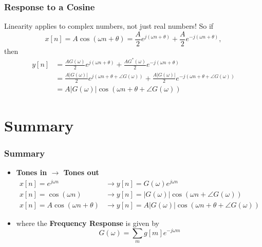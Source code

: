 \documentclass{beamer}
\begin{document}
\begin{frame}
  \frametitle{Response to a Cosine}
  Linearity applies to complex numbers, not just  real numbers!
  So if
  \[
  x[n] = A\cos(\omega n+\theta) = \frac{A}{2}e^{j(\omega n+\theta)}+\frac{A}{2}e^{-j(\omega n+\theta)},
  \]
  then
  \begin{align*}
    y[n] &= \frac{AG(\omega)}{2}e^{j(\omega n+\theta)}+\frac{AG^*(\omega)}{2}e^{-j(\omega n+\theta)}\\
    &= \frac{A|G(\omega)|}{2}e^{j(\omega n+\theta+\angle G(\omega))}+\frac{A|G(\omega)|}{2}e^{-j(\omega n+\theta+\angle G(\omega))}\\
    &= A|G(\omega)|\cos\left(\omega n+\theta+\angle G(\omega)\right)
  \end{align*}
\end{frame}

\section[Summary]{Summary}
\setcounter{subsection}{1}

\begin{frame}
  \frametitle{Summary}
  \begin{itemize}
  \item {\bf Tones in $\rightarrow$ Tones out}
    \begin{align*}
      x[n]=e^{j\omega n} &\rightarrow y[n]=G(\omega)e^{j\omega n}\\
      x[n]=\cos\left(\omega n\right)
      &\rightarrow y[n]=|G(\omega)|\cos\left(\omega n+\angle G(\omega)\right)\\
      x[n]=A\cos\left(\omega n+\theta\right)
      &\rightarrow y[n]=A|G(\omega)|\cos\left(\omega n+\theta+\angle G(\omega)\right)
    \end{align*}
  \item where the {\bf Frequency Response} is given by
    \[
    G(\omega) = \sum_m g[m]e^{-j\omega m}
    \]
  \end{itemize}
\end{frame}  
        
\end{document}
